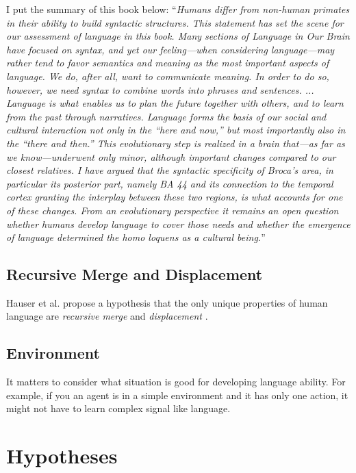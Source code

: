 \documentclass[12pt]{article}
\begin{document}
I put the summary of this book below: ``\textit{Humans differ from non-human primates in their ability to build syntactic structures. This
statement has set the scene for our assessment of language in this book. Many sections of
Language in Our Brain have focused on syntax, and yet our feeling—when considering
language—may rather tend to favor semantics and meaning as the most important aspects
of language. We do, after all, want to communicate meaning. In order to do so, however,
we need syntax to combine words into phrases and sentences. ... 
Language is what enables us to plan the future together with others, and to learn from the
past through narratives. Language forms the basis of our social and cultural interaction not
only in the “here and now,” but most importantly also in the “there and then.”
This evolutionary step is realized in a brain that—as far as we know—underwent only
minor, although important changes compared to our closest relatives. I have argued that
the syntactic specificity of Broca’s area, in particular its posterior part, namely BA 44 and
its connection to the temporal cortex granting the interplay between these two regions, is
what accounts for one of these changes. From an evolutionary perspective it remains an
open question whether humans develop language to cover those needs and whether the
emergence of language determined the homo loquens as a cultural being.}''

\subsection{Recursive Merge and Displacement}
Hauser et al. propose a hypothesis that the only unique properties of human language are 
\textit{recursive merge } and \textit{displacement} \cite{Hauser02}.

\subsection{Environment}
It matters to consider what situation is good for developing language ability. For 
example, if you an agent is in a simple environment and it has only one action, it 
might not have to learn complex signal like language.

\section{Hypotheses}




\end{document}
